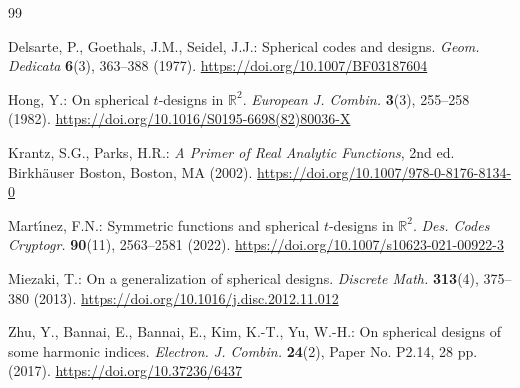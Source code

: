 \documentclass{amsart}
\theoremstyle{definition}
\begin{document}
\begin{thebibliography}{99}

Delsarte, P., Goethals, J.M., Seidel, J.J.:
\newblock Spherical codes and designs.
\newblock \emph{Geom. Dedicata} \textbf{6}(3), 363--388 (1977).
\newblock \url{https://doi.org/10.1007/BF03187604}

Hong, Y.:
\newblock On spherical \(t\)-designs in \(\mathbb{R}^{2}\).
\newblock \emph{European J. Combin.} \textbf{3}(3), 255--258 (1982).
\newblock \url{https://doi.org/10.1016/S0195-6698(82)80036-X}

Krantz, S.G., Parks, H.R.:
\newblock \emph{A Primer of Real Analytic Functions}, 2nd ed.
\newblock Birkh\"auser Boston, Boston, MA (2002).
\newblock \url{https://doi.org/10.1007/978-0-8176-8134-0}

Mart\'{\i}nez, F.N.:
\newblock Symmetric functions and spherical \(t\)-designs in \(\mathbb{R}^{2}\).
\newblock \emph{Des. Codes Cryptogr.} \textbf{90}(11), 2563--2581 (2022).
\newblock \url{https://doi.org/10.1007/s10623-021-00922-3}

Miezaki, T.:
\newblock On a generalization of spherical designs.
\newblock \emph{Discrete Math.} \textbf{313}(4), 375--380 (2013).
\newblock \url{https://doi.org/10.1016/j.disc.2012.11.012}

Zhu, Y., Bannai, E., Bannai, E., Kim, K.-T., Yu, W.-H.:
\newblock On spherical designs of some harmonic indices.
\newblock \emph{Electron. J. Combin.} \textbf{24}(2), Paper No. P2.14, 28 pp. (2017).
\newblock \url{https://doi.org/10.37236/6437}

\end{thebibliography}
\end{document}

